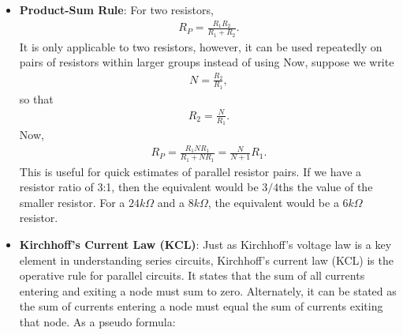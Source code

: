 \documentclass{report}
\begin{document}
\begin{itemize}
            \begin{align*}
                R_{P} = \frac{1}{\frac{1}{R_{1}}} = R_{1}
            .\end{align*}
            Now, consider what happens when we add $R_{2}$. Since resistance is non-negative, adding $1/R_{2}$ admits 
            \begin{align*}
                \frac{1}{R_{1}} + \frac{1}{R_{2}} > \frac{1}{R_{1}}
            .\end{align*}
            Thus,
            \begin{align*}
                \frac{1}{\frac{1}{R_{1}} + \frac{1}{R_{2}}} < \frac{1}{\frac{1}{R_{1}}} = R_{1}
            .\end{align*}
            Thus, the combined resistance is smaller than the smallest resistor in the parallel series.
        \item \textbf{Product-Sum Rule}: For two resistors, 
            \begin{align*}
                R_{P} = \frac{R_{1}R_{2}}{R_{1} + R_{2}}
            .\end{align*}
            It is only applicable to two resistors, however, it can be used repeatedly on pairs of resistors within larger groups instead of using
            \bigbreak \noindent 
            Now, suppose we write
            \begin{align*}
                N = \frac{R_{2}}{R_{1}}
            ,\end{align*}
            so that
            \begin{align*}
                R_{2} = \frac{N}{R_{1}}
            .\end{align*}
            Now,
            \begin{align*}
               R_{P} = \frac{R_{1}NR_{1}}{R_{1} + NR_{1}}  = \frac{N}{N+1}R_{1}
            .\end{align*}
            This is useful for quick estimates of parallel resistor pairs. If we have a resistor ratio of 3:1, then the equivalent would be $3/4$ths the value of the smaller resistor. For a $24 k\Omega$ and a $8 k \Omega$, the equivalent would be a $6 k \Omega$ resistor.
        \item \textbf{Kirchhoff's Current Law (KCL)}: Just as Kirchhoff's voltage law is a key element in understanding series circuits, Kirchhoff's current law (KCL) is the operative rule for parallel circuits. It states that the sum of all currents entering and exiting a node must sum to zero. Alternately, it can be stated as the sum of currents entering a node must equal the sum of currents exiting that node. As a pseudo formula: 

\end{itemize}
\end{document}
